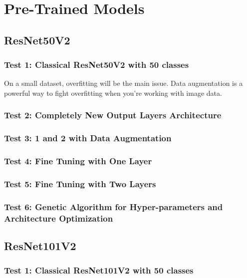 \section{Pre-Trained Models}

\subsection{ResNet50V2}

\subsubsection{Test 1: Classical ResNet50V2 with 50 classes}
On a small dataset, overfitting will be the main issue. Data augmentation is a powerful way to fight overfitting when you’re working with image data.

\subsubsection{Test 2: Completely New Output Layers Architecture}

\subsubsection{Test 3: 1 and 2 with Data Augmentation}

\subsubsection{Test 4: Fine Tuning with One Layer}

\subsubsection{Test 5: Fine Tuning with Two Layers}

\subsubsection{Test 6: Genetic Algorithm for Hyper-parameters and Architecture Optimization}







\subsection{ResNet101V2}

\subsubsection{Test 1: Classical ResNet101V2 with 50 classes}

